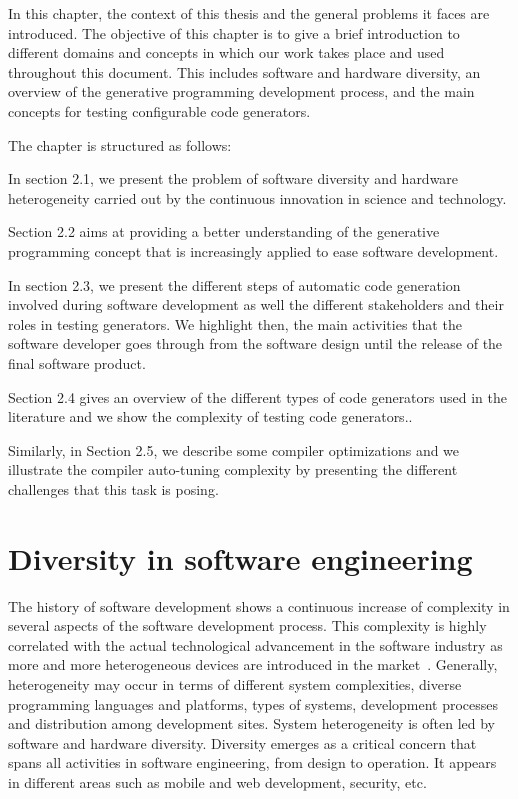  
In this chapter, the context of this thesis and the general problems it faces are introduced. The objective of this chapter is to give a brief introduction to  different domains and concepts in which our work takes place and used throughout this document.
This includes software and hardware diversity, an overview of the generative programming development process, and the main concepts for testing configurable code generators.


The chapter is structured as follows: 

In section 2.1, we present the problem of software diversity and hardware heterogeneity carried out by the continuous innovation in science and technology.

Section 2.2 aims at providing a better understanding of the generative programming concept that is increasingly applied to ease software development. 

In section 2.3, we present the different steps of automatic code generation involved during software development as well the different stakeholders and their roles in testing generators. We highlight then, the main activities that the software developer goes through from the software design until the release of the final software product.

Section 2.4 gives an overview of the different types of code generators used in the literature and we show the complexity of testing code generators.. 

Similarly, in Section 2.5, we describe some compiler optimizations and we illustrate the compiler auto-tuning complexity by presenting the different challenges that this task is posing.


\section{Diversity in software engineering}
The history of software development shows a continuous increase of complexity in several aspects of the software development process. This complexity is highly correlated with the actual technological advancement in the software industry as more and more heterogeneous devices are introduced in the market~\cite{betz2011improving}. 
Generally, heterogeneity may occur in terms of different system complexities, diverse programming languages and platforms, types of systems, development processes and distribution among development sites\cite{ghazi2015heterogeneous}.
System heterogeneity is often led by software and hardware diversity.
Diversity emerges as a critical concern that spans all activities in software engineering, from design to operation\cite{acher2014software}. It appears in different areas such as mobile and web development\cite{doukas2013compose}, security\cite{allier2015multitier}, etc.

